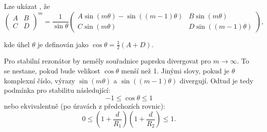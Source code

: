 \documentclass[a4paper,12pt]{article}
\begin{document}
Lze ukázat \cite{eowm}, že
$$
\begin{pmatrix}
A & B\\
C & D
\end{pmatrix}^m = \frac{1}{\sin \theta}\begin{pmatrix}
A \sin(m\theta) - \sin((m-1)\theta) & B \sin(m\theta) \\
C \sin(m\theta) & D \sin((m-1)\theta)
\end{pmatrix},
$$

kde úhel $\theta$ je definován jako $\cos\theta = \frac{1}{2}(A+D)$.

Pro stabilní rezonátor by neměly souřadnice paprsku divergovat pro $m \rightarrow \infty$. To se nestane, pokud bude velikost $\cos\theta$ menší než 1. Jinými slovy, pokud je $\theta$ komplexní číslo, výrazy $\sin(m \theta)$ a $\sin((m-1)\theta)$ divergují. Odtud je tedy podmínka pro stabilitu následující:
$$
-1 \le \cos\theta \le 1
$$
nebo ekvivalentně (po úravách z předchozích rovnic):
$$
0 \le (1+\frac{d}{R_1})(1+\frac{d}{R_2}) \le 1.
$$



\end{document}
